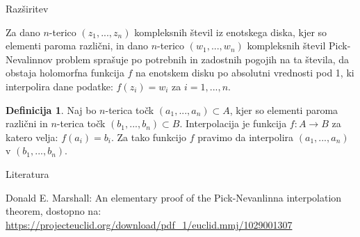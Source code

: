 \documentclass{beamer}
\theoremstyle{definition} %
\newtheorem{definicija}{Definicija}[section]
\theoremstyle{plain} %
\begin{document}
	\begin{frame}{Razširitev}
		
		Za dano $n$-terico $(z_1,...,z_n)$ kompleksnih števil iz enotskega diska, kjer so elementi paroma različni, in dano $n$-terico $(w_1,...,w_n)$ kompleksnih števil Pick-Nevalinnov problem sprašuje po potrebnih in zadostnih pogojih na ta števila, da obstaja holomorfna funkcija $f$ na enotskem disku po absolutni vrednosti pod 1, ki interpolira dane podatke: $f(z_i) = w_i$ za $i = 1,...,n$. 

		\begin{definicija}
			Naj bo $n$-terica točk $(a_1,...,a_n) \subset A$, kjer so elementi paroma različni in $n$-terica točk $(b_1,...,b_n) \subset B$. Interpolacija je funkcija $f:A \rightarrow B$ za katero velja: $f(a_i) = b_i$. Za tako funkcijo  $f$ pravimo da interpolira $(a_1,...,a_n)$ v  $(b_1,...,b_n)$.
		\end{definicija}
		
	\end{frame}
	
	
	
	
	\begin{frame}{Literatura}
		\begin{thebibliography}{1}
			
			Donald E. Marshall:
			An elementary proof of the Pick-Nevanlinna interpolation theorem, dostopno na:
			\url{https://projecteuclid.org/download/pdf_1/euclid.mmj/1029001307}
			
			
			
		\end{thebibliography}
	\end{frame}
	
	
\end{document}
